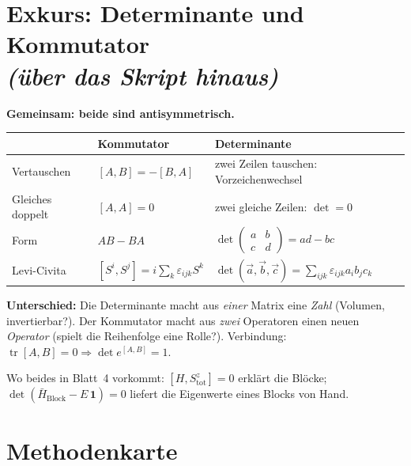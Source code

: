 \documentclass[11pt,a4paper]{article}
\newcommand{\Hbar}{\bar H}
\begin{document}
\section[Exkurs: Determinante und Kommutator]{Exkurs: Determinante und Kommutator\\\large\emph{(über das Skript hinaus)}}

\textbf{Gemeinsam: beide sind antisymmetrisch.}
\begin{center}
\begin{tabular}{@{}lll@{}}
\toprule
& Kommutator & Determinante\\
\midrule
Vertauschen & $[A,B] = -[B,A]$ & zwei Zeilen tauschen: Vorzeichenwechsel\\
Gleiches doppelt & $[A,A] = 0$ & zwei gleiche Zeilen: $\det = 0$\\
Form & $AB - BA$ & $\det\begin{pmatrix}a&b\\c&d\end{pmatrix} = ad - bc$\\
Levi-Civita & $[S^i,S^j] = i\sum_k\varepsilon_{ijk}S^k$ & $\det(\vec a,\vec b,\vec c) = \sum_{ijk}\varepsilon_{ijk}a_ib_jc_k$\\
\bottomrule
\end{tabular}
\end{center}

\textbf{Unterschied:} Die Determinante macht aus \emph{einer} Matrix eine \emph{Zahl} (Volumen, invertierbar?). Der Kommutator macht aus \emph{zwei} Operatoren einen neuen \emph{Operator} (spielt die Reihenfolge eine Rolle?). Verbindung: $\operatorname{tr}[A,B] = 0 \Rightarrow \det e^{[A,B]} = 1$.

\begin{merk}
Wo beides in Blatt~4 vorkommt: $[H,S^z_\text{tot}]=0$ erklärt die Blöcke; $\det(\Hbar_\text{Block}-E\,\mathbf1)=0$ liefert die Eigenwerte eines Blocks von Hand.
\end{merk}

\section{Methodenkarte}
\end{document}
